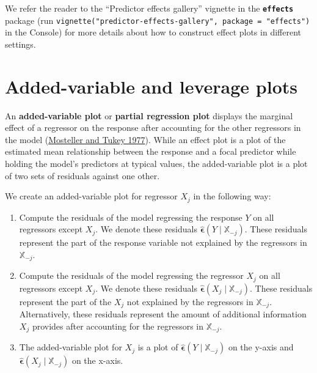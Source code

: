 \documentclass[
]{book}
\providecommand{\tightlist}{%
  \setlength{\itemsep}{0pt}\setlength{\parskip}{0pt}}
\theoremstyle{definition}
\theoremstyle{definition}
\theoremstyle{definition}
\theoremstyle{definition}
\theoremstyle{remark}
\begin{document}
We refer the reader to the ``Predictor effects gallery'' vignette in the
\textbf{\texttt{effects}} package (run
\texttt{vignette("predictor-effects-gallery",\ package\ =\ "effects")} in the
Console) for more details about how to construct effect plots in
different settings.

\hypertarget{added-variable-and-leverage-plots}{%
\section{Added-variable and leverage plots}\label{added-variable-and-leverage-plots}}

An \textbf{added-variable plot} or \textbf{partial regression plot} displays the
marginal effect of a regressor on the response after accounting for the
other regressors in the model (\protect\hyperlink{ref-mt1977}{Mosteller and Tukey 1977}). While an effect plot is a plot
of the estimated mean relationship between the response and a focal
predictor while holding the model's predictors at typical values, the
added-variable plot is a plot of two sets of residuals against one
other.

We create an added-variable plot for regressor \(X_j\) in the following
way:

\begin{enumerate}
\def\labelenumi{\arabic{enumi}.}
\tightlist
\item
  Compute the residuals of the model regressing the response \(Y\) on
  all regressors except \(X_j\). We denote these residuals
  \(\hat{\boldsymbol{\epsilon}}(Y\mid \mathbb{X}_{-j})\). These
  residuals represent the part of the response variable not explained
  by the regressors in \(\mathbb{X}_{-j}\).
\item
  Compute the residuals of the model regressing the regressor \(X_j\) on
  all regressors except \(X_j\). We denote these residuals
  \(\hat{\boldsymbol{\epsilon}}(X_j \mid \mathbb{X}_{-j})\). These
  residuals represent the part of the \(X_j\) not explained by the
  regressors in \(\mathbb{X}_{-j}\). Alternatively, these residuals
  represent the amount of additional information \(X_j\) provides after
  accounting for the regressors in \(\mathbb{X}_{-j}\).
\item
  The added-variable plot for \(X_j\) is a plot of
  \(\hat{\boldsymbol{\epsilon}}(Y\mid \mathbb{X}_{-j})\) on the y-axis
  and \(\hat{\boldsymbol{\epsilon}}(X_j \mid \mathbb{X}_{-j})\) on the
  x-axis.
\end{enumerate}
\end{document}
